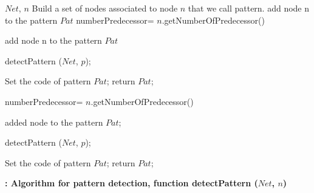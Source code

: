 \begin{algorithm}
\begin{algorithmic}[1]
\REQUIRE $Net$, $n$ 
\ENSURE Build a set of nodes associated to node $n$ that we call pattern.
   \STATE add node n to the pattern $Pat$
   \STATE numberPredecessor= $n$.getNumberOfPredecessor() %
   
      \STATE add node n to the pattern $Pat$
    \ENDCASE
    
      \STATE detectPattern ($Net$, $p$);
    \ENDCASE
    
    \ENDSWITCH
   \ENDFOR
      \STATE Set the code of pattern $Pat$;
      \STATE return $Pat$;
   \ENDCASE
   
     \STATE
     \ENDCASE
 
   \ENDSWITCH
\ENDCASE
   
   
   \STATE numberPredecessor= $n$.getNumberOfPredecessor() %
   
      \STATE added node to the pattern $Pat$;
    \ENDCASE
    
      \STATE detectPattern ($Net$, $p$);
    \ENDCASE
    
    \ENDSWITCH
   \ENDFOR
      \STATE Set the code of pattern $Pat$;
      \STATE return $Pat$;
   \ENDCASE
   
   \STATE
   \ENDCASE
  
   \ENDSWITCH
 \ENDCASE

\ENDSWITCH

\end{algorithmic}
\caption{\bf: Algorithm for pattern detection, function detectPattern ($Net$, $n$)} \label{PatternDetection}
\end{algorithm}

